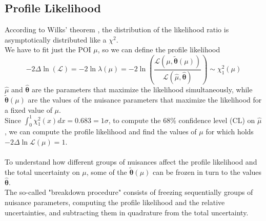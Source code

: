\subsection{Profile Likelihood}
According to Wilks' theorem \cite{James2006StatisticalEdition}, the distribution of the likelihood ratio is asymptotically distributed like a $\chi^2$.
\\
We have to fit just the POI $\mu$, so we can define the profile likelihood
\begin{equation}
    -2 \Delta \ln(\mathcal{L})=-2 \ln{\lambda(\mu)}= -2 \ln \left( \frac{\mathcal{L}(\mu,\bm{\tilde{\theta}}(\mu))}{\mathcal{L}(\hat{\mu}, \bm{\hat{\theta}})}\right) \sim \chi^2_1(\mu)
\end{equation}
$\hat{\mu}$ and $\bm{\hat{\theta}}$ are the parameters that maximize the likelihood simultaneously, while $\bm{\tilde{\theta}}(\mu)$ are the values of the nuisance parameters that maximize the likelihood for a fixed value of $\mu$.\\
Since $\int_0^1\chi^2_1(x) dx =0.683 = 1\sigma$, to compute the 68\% confidence level (CL) on $\hat{\mu}$, we can compute the profile likelihood and find the values of $\mu$ for which holds $-2\Delta \ln{\mathcal{L}(\mu)}=1$.\\
\\
To understand how different groups of nuisances affect the profile likelihood and the total uncertainty on $\mu$, some of the $\bm{\tilde{\theta}}(\mu)$ can be frozen in turn to the values $\bm{\hat{\theta}}$.\\
The so-called "breakdown procedure" consists of freezing sequentially groups of nuisance parameters, computing the profile likelihood and the relative uncertainties, and subtracting them in quadrature from the total uncertainty.


